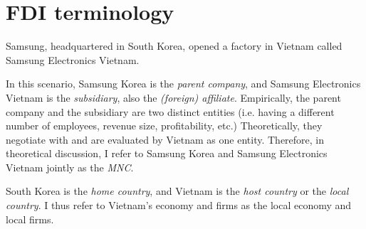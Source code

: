 \chapter{FDI terminology}

Samsung, headquartered in South Korea, opened a factory in Vietnam called
Samsung Electronics Vietnam.

In this scenario, Samsung Korea is the \textit{parent company}, and Samsung Electronics Vietnam is the
\textit{subsidiary}, also the \textit{(foreign) affiliate}. Empirically, the parent company and the
subsidiary are two distinct entities (i.e. having a different number of
employees, revenue size, profitability, etc.) Theoretically, they negotiate with
and are evaluated by Vietnam as one entity. Therefore, in theoretical
discussion, I refer to Samsung Korea and Samsung Electronics Vietnam jointly as
the \textit{MNC}.

South Korea is the \textit{home country}, and Vietnam is the \textit{host
  country} or the \textit{local country}. I thus refer to Vietnam's economy and firms as the local economy and local firms.

